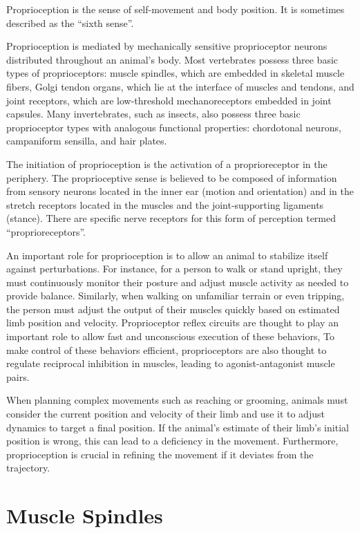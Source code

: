 Proprioception is the sense of self-movement and body position. It is sometimes described as the ``sixth sense''.

Proprioception is mediated by mechanically sensitive proprioceptor neurons distributed throughout an animal's body. Most vertebrates possess three basic types of proprioceptors: muscle spindles, which are embedded in skeletal muscle fibers, Golgi tendon organs, which lie at the interface of muscles and tendons, and joint receptors, which are low-threshold mechanoreceptors embedded in joint capsules. Many invertebrates, such as insects, also possess three basic proprioceptor types with analogous functional properties: chordotonal neurons, campaniform sensilla, and hair plates.

The initiation of proprioception is the activation of a proprioreceptor in the periphery. The proprioceptive sense is believed to be composed of information from sensory neurons located in the inner ear (motion and orientation) and in the stretch receptors located in the muscles and the joint-supporting ligaments (stance). There are specific nerve receptors for this form of perception termed ``proprioreceptors''.

An important role for proprioception is to allow an animal to stabilize itself against perturbations. For instance, for a person to walk or stand upright, they must continuously monitor their posture and adjust muscle activity as needed to provide balance. Similarly, when walking on unfamiliar terrain or even tripping, the person must adjust the output of their muscles quickly based on estimated limb position and velocity. Proprioceptor reflex circuits are thought to play an important role to allow fast and unconscious execution of these behaviors, To make control of these behaviors efficient, proprioceptors are also thought to regulate reciprocal inhibition in muscles, leading to agonist-antagonist muscle pairs.

When planning complex movements such as reaching or grooming, animals must consider the current position and velocity of their limb and use it to adjust dynamics to target a final position. If the animal's estimate of their limb's initial position is wrong, this can lead to a deficiency in the movement. Furthermore, proprioception is crucial in refining the movement if it deviates from the trajectory.

\hypertarget{muscle-spindles}{%
\section{Muscle Spindles}\label{muscle-spindles}}

